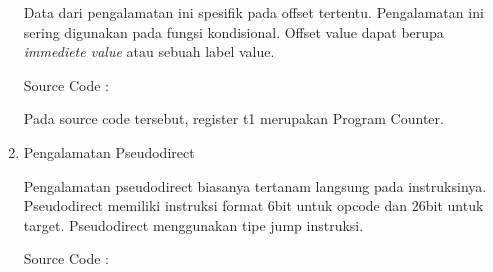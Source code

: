 \documentclass{class}
\begin{document}
\begin{enumerate}
      Data dari pengalamatan ini spesifik pada offset tertentu.
      Pengalamatan ini sering digunakan pada fungsi kondisional.
      Offset value dapat berupa \emph{immediete value} atau sebuah label value.

      Source Code : 

      

      Pada source code tersebut, register t1 merupakan Program Counter.


      \item Pengalamatan Pseudodirect
      
      Pengalamatan pseudodirect biasanya tertanam langsung pada instruksinya. 
      Pseudodirect memiliki instruksi format 6bit untuk opcode dan 26bit untuk target.
      Pseudodirect menggunakan tipe jump instruksi. 

      
      Source Code : 
      


\end{enumerate}
\end{document}
